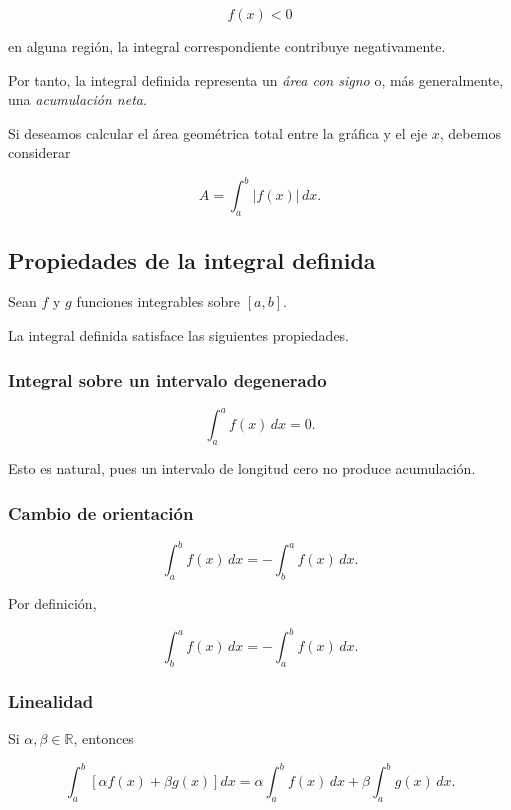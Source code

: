 \documentclass[12pt]{article}
\begin{document}
\[
f(x)<0
\]

en alguna región, la integral correspondiente contribuye negativamente.

Por tanto, la integral definida representa un \emph{área con signo} o,
más generalmente, una \emph{acumulación neta}.

Si deseamos calcular el área geométrica total entre la gráfica y el eje
$x$, debemos considerar

\[
\boxed{
A=\int_a^b |f(x)|\,dx.
}
\]

\subsection{Propiedades de la integral definida}

Sean $f$ y $g$ funciones integrables sobre $[a,b]$.

La integral definida satisface las siguientes propiedades.

\subsubsection*{Integral sobre un intervalo degenerado}

\[
\boxed{
\int_a^a f(x)\,dx=0.
}
\]

Esto es natural, pues un intervalo de longitud cero no produce acumulación.


\subsubsection*{Cambio de orientación}

\[
\boxed{
\int_a^b f(x)\,dx
=
-\int_b^a f(x)\,dx.
}
\]

Por definición,

\[
\int_b^a f(x)\,dx
=
-\int_a^b f(x)\,dx.
\]


\subsubsection*{Linealidad}

Si $\alpha,\beta\in\mathbb{R}$, entonces

\[
\boxed{
\int_a^b
\left[
\alpha f(x)+\beta g(x)
\right]dx
=
\alpha\int_a^b f(x)\,dx
+
\beta\int_a^b g(x)\,dx.
}
\]
\end{document}
